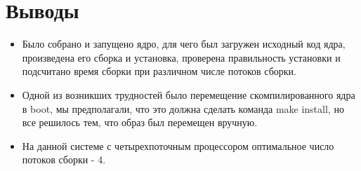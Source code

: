 \documentclass[a4paper]{article}
\begin{document}
    \section{Выводы}
    \begin{itemize}
        \item Было собрано и запущено ядро, для чего был загружен исходный код ядра,
        произведена его сборка и установка, проверена правильность установки и
        подсчитано время сборки при различном числе потоков сборки.
        \item Одной из возникших трудностей было перемещение скомпилированного ядра в boot, мы
        предполагали, что это должна сделать команда make install, но все решилось
        тем, что образ был перемещен вручную.
        \item На данной системе с четырехпоточным процессором оптимальное число потоков сборки - 4.
    \end{itemize}
\end{document}
